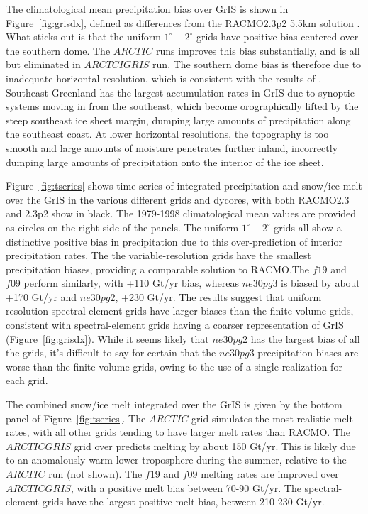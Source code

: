 \documentclass[draft]{agujournal2019}
\begin{document}
The climatological mean precipitation bias over GrIS is shown in Figure~\ref{fig:grisdx}, defined as differences from the RACMO2.3p2 5.5km solution \cite{NETAL2019SCIENCE}. What sticks out is that the uniform $1^{\circ}-2^{\circ}$ grids have positive bias centered over the southern dome. The $ARCTIC$ runs improves this bias substantially, and is all but eliminated in $ARCTCIGRIS$ run. The southern dome bias is therefore due to inadequate horizontal resolution, which is consistent with the results of \cite{VETAL2018TC}. Southeast Greenland has the largest accumulation rates in GrIS due to synoptic systems moving in from the southeast, which become orographically lifted by the steep southeast ice sheet margin, dumping large amounts of precipitation along the southeast coast. At lower horizontal resolutions, the topography is too smooth and large amounts of moisture penetrates further inland, incorrectly dumping large amounts of precipitation onto the interior of the ice sheet.

Figure~\ref{fig:tseries} shows time-series of integrated precipitation and snow/ice melt over the GrIS in the various different grids and dycores, with both RACMO2.3 and 2.3p2 show in black. The 1979-1998 climatological mean values are provided as circles on the right side of the panels. The uniform $1^{\circ}-2^{\circ}$ grids all show a distinctive positive bias in precipitation due to this over-prediction of interior precipitation rates. The the variable-resolution grids have the smallest precipitation biases, providing a comparable solution to RACMO.The $f19$ and $f09$ perform similarly, with +110 Gt/yr bias, whereas $ne30pg3$ is biased by about +170 Gt/yr and $ne30pg2$, +230 Gt/yr. The results suggest that uniform resolution spectral-element grids have larger biases than the finite-volume grids, consistent with spectral-element grids having a coarser representation of GrIS (Figure~\ref{fig:grisdx}). While it seems likely that $ne30pg2$ has the largest bias of all the grids, it's difficult to say for certain that the $ne30pg3$ precipitation biases are worse than the finite-volume grids, owing to the use of a single realization for each grid.

The combined snow/ice melt integrated over the GrIS is given by the bottom panel of Figure~\ref{fig:tseries}. The $ARCTIC$ grid simulates the most realistic melt rates, with all other grids tending to have larger melt rates than RACMO. The $ARCTICGRIS$ grid over predicts melting by about 150 Gt/yr. This is likely due to an anomalously warm lower troposphere during the summer, relative to the $ARCTIC$ run (not shown). The $f19$ and $f09$ melting rates are improved over $ARCTICGRIS$, with a positive melt bias between 70-90 Gt/yr. The spectral-element grids have the largest positive melt bias, between 210-230 Gt/yr.
\end{document}
